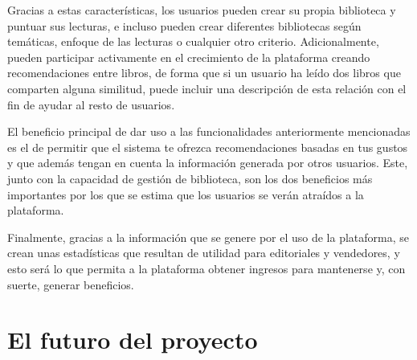 Gracias a estas características, los usuarios pueden crear su propia biblioteca y puntuar sus lecturas, e incluso pueden crear diferentes bibliotecas según temáticas, enfoque de las lecturas o cualquier otro criterio. Adicionalmente, pueden participar activamente en el crecimiento de la plataforma creando recomendaciones entre libros, de forma que si un usuario ha leído dos libros que comparten alguna similitud, puede incluir una descripción de esta relación con el fin de ayudar al resto de usuarios.

El beneficio principal de dar uso a las funcionalidades anteriormente mencionadas es el de permitir que el sistema te ofrezca recomendaciones basadas en tus gustos y que además tengan en cuenta la información generada por otros usuarios. Este, junto con la capacidad de gestión de biblioteca, son los dos beneficios más importantes por los que se estima que los usuarios se verán atraídos a la plataforma.

Finalmente, gracias a la información que se genere por el uso de la plataforma, se crean unas estadísticas que resultan de utilidad para editoriales y vendedores, y esto será lo que permita a la plataforma obtener ingresos para mantenerse y, con suerte, generar beneficios.

\section{El futuro del proyecto}